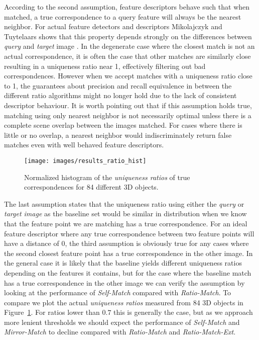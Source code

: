\documentclass[journal]{IEEEtran}
\begin{document}
According to the second assumption, feature descriptors behave such that
when matched, a true correspondence to a query feature will always be 
the nearest neighbor. For actual feature detectors and descriptors 
Mikolajczyk and Tuytelaars shows that this property depends strongly on 
the differences between \emph{query} and \emph{target} image 
\cite{mikolajczyk2005performance} \cite{tuytelaars2008local}. In the 
degenerate case where the closest match is not an actual correspondence, 
it is often the case that other matches are similarly close resulting in 
a uniqueness ratio near 1, effectively filtering out bad 
correspondences.  However when we accept matches with a uniqueness ratio
close to 1, the guarantees about precision and recall equivalence in 
between the different ratio algorithms might no longer hold due to the 
lack of consistent descriptor behaviour. It is worth pointing out that 
if this assumption holds true, matching using only nearest neighbor is 
not necessarily optimal unless there is a complete scene overlap between
the images matched. For cases where there is little or no overlap, a 
nearest neighbor would indiscriminately return false matches even with 
well behaved feature descriptors.

\begin{figure}[t]
\centering
\texttt{[image: images/results\_ratio\_hist]}
\caption{Normalized histogram of the \emph{uniqueness ratios} of true 
correspondences for 84 different 3D objects.}
\label{fig:ratio_hist}
\end{figure}

The last assumption states that the uniqueness ratio using either the 
\emph{query} or \emph{target image} as the baseline set would be similar
in distribution when we know that the feature point we are matching has 
a true correspondence. For an ideal feature descriptor where any true 
correspondence between two feature points will have a distance of $0$, 
the third assumption is obviously true for any cases where the second 
closest feature point has a true correspondence in the other image. In 
the general case it is likely that the baseline yields different 
uniqueness ratios depending on the features it contains, but for the 
case where the baseline match has a true correspondence in the other 
image we can verify the assumption by looking at the performance of 
\emph{Self-Match} compared with \emph{Ratio-Match}. To compare we plot 
the actual \emph{uniqueness ratios} measured from 84 3D objects in 
Figure~\ref{fig:ratio_hist}. For ratios lower than $0.7$ this is 
generally the case, but as we approach more lenient thresholds we should
expect the performance of \emph{Self-Match} and \emph{Mirror-Match} to 
decline compared with \emph{Ratio-Match} and \emph{Ratio-Match-Ext}.
\end{document}
